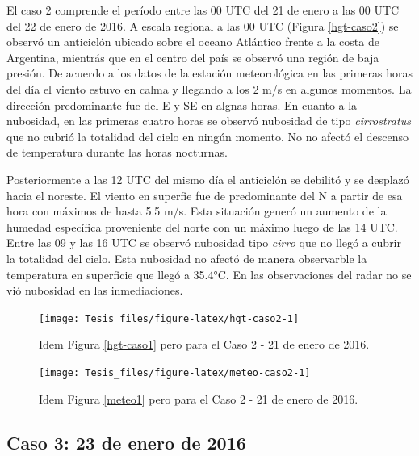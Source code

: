 \documentclass[12pt,spanish,oneside]{book}
\begin{document}
El caso 2 comprende el período entre las 00 UTC del 21 de enero a las 00
UTC del 22 de enero de 2016. A escala regional a las 00 UTC (Figura
\ref{hgt-caso2}) se observó un anticiclón ubicado sobre el oceano
Atlántico frente a la costa de Argentina, mientrás que en el centro del
país se observó una región de baja presión. De acuerdo a los datos de la
estación meteorológica en las primeras horas del día el viento estuvo en
calma y llegando a los 2 m/s en algunos momentos. La dirección
predominante fue del E y SE en algnas horas. En cuanto a la nubosidad,
en las primeras cuatro horas se observó nubosidad de tipo
\emph{cirrostratus} que no cubrió la totalidad del cielo en ningún
momento. No no afectó el descenso de temperatura durante las horas
nocturnas.

Posteriormente a las 12 UTC del mismo día el anticiclón se debilitó y se
desplazó hacia el noreste. El viento en superfie fue de predominante del
N a partir de esa hora con máximos de hasta 5.5 m/s. Esta situación
generó un aumento de la humedad específica proveniente del norte con un
máximo luego de las 14 UTC. Entre las 09 y las 16 UTC se observó
nubosidad tipo \emph{cirro} que no llegó a cubrir la totalidad del
cielo. Esta nubosidad no afectó de manera observarble la temperatura en
superficie que llegó a 35.4°C. En las observaciones del radar no se vió
nubosidad en las inmediaciones.

\begin{figure}

{\centering \texttt{[image: Tesis\_files/figure-latex/hgt-caso2-1]} 

}

\caption{Idem Figura \ref{hgt-caso1} pero para el Caso 2 - 21 de enero de 2016. \label{hgt-caso2}}\label{fig:hgt-caso2}
\end{figure}

\begin{figure}

{\centering \texttt{[image: Tesis\_files/figure-latex/meteo-caso2-1]} 

}

\caption{Idem Figura \ref{meteo1} pero para el Caso 2 - 21 de enero de 2016. \label{meteo2}}\label{fig:meteo-caso2}
\end{figure}

\subsection{Caso 3: 23 de enero de
2016}\label{caso-3-23-de-enero-de-2016}
\end{document}
